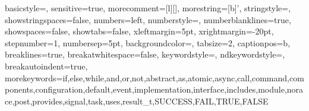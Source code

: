 {\lstset{language=MacroLab}}
{}

{
  basicstyle=\ttfamily\small,
  sensitive=true,
  morecomment=[l][\color{red}\small]{\/\/},
  morestring=[b]',
  stringstyle=\color{dkgreen}, %
  showstringspaces=false,   
  numbers=left, %
  numberstyle=\ttfamily\small\color{gray}, %
  numberblanklines=true,
  showspaces=false,
  showtabs=false,
  xleftmargin=5pt,
  xrightmargin=-20pt,
  stepnumber=1,   
  numbersep=5pt,   
  backgroundcolor=\color{white},   
  tabsize=2,
  captionpos=b,   
  breaklines=true,
  breakatwhitespace=false,
  keywordstyle=\color{blue},   
  ndkeywordstyle=\color{red},   
  breakautoindent=true,
  morekeywords={if,else,while,and,or,not,abstract,as,atomic,async,call,command,components,configuration,default,event,implementation,interface,includes,module,norace,post,provides,signal,task,uses,result_t,SUCCESS,FAIL,TRUE,FALSE}
}

{\lstset{language=nesC}}
{}

